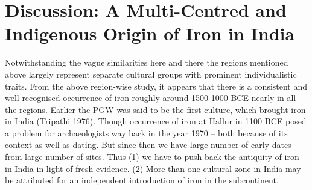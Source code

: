 \section*{Discussion: A Multi-Centred and Indigenous Origin of Iron in India}\label{chapter3-section-5}

Notwithstanding the vague similarities here and there the regions mentioned above largely represent separate cultural groups with prominent individualistic traits. From the above region-wise study, it appears that there is a consistent and well recognised occurrence of iron roughly around 1500-1000 BCE nearly in all the regions. Earlier the PGW was said to be the first culture, which brought iron in India (Tripathi 1976). Though occurrence of iron at Hallur in 1100 BCE posed a problem for archaeologists way back in the year 1970 – both because of its context as well as dating. But since then we have large number of early dates from large number of sites. Thus (1) we have to push back the antiquity of iron in India in light of fresh evidence. (2) More than one cultural zone in India may be attributed for an independent introduction of iron in the subcontinent.

